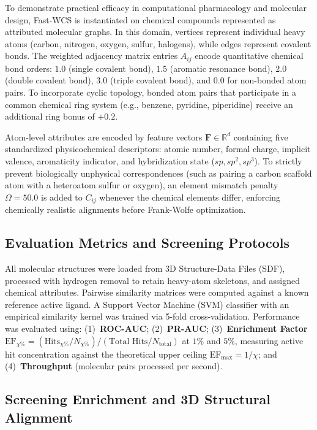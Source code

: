 \documentclass[conference]{IEEEtran}
\begin{document}
To demonstrate practical efficacy in computational pharmacology and molecular design, Fast-WCS is instantiated on chemical compounds represented as attributed molecular graphs. In this domain, vertices represent individual heavy atoms (carbon, nitrogen, oxygen, sulfur, halogens), while edges represent covalent bonds. The weighted adjacency matrix entries $A_{ij}$ encode quantitative chemical bond orders: $1.0$ (single covalent bond), $1.5$ (aromatic resonance bond), $2.0$ (double covalent bond), $3.0$ (triple covalent bond), and $0.0$ for non-bonded atom pairs. To incorporate cyclic topology, bonded atom pairs that participate in a common chemical ring system (e.g., benzene, pyridine, piperidine) receive an additional ring bonus of $+0.2$.

Atom-level attributes are encoded by feature vectors $\mathbf{F} \in \mathbb{R}^{d}$ containing five standardized physicochemical descriptors: atomic number, formal charge, implicit valence, aromaticity indicator, and hybridization state ($sp, sp^2, sp^3$). To strictly prevent biologically unphysical correspondences (such as pairing a carbon scaffold atom with a heteroatom sulfur or oxygen), an element mismatch penalty $\Omega = 50.0$ is added to $C_{ij}$ whenever the chemical elements differ, enforcing chemically realistic alignments before Frank-Wolfe optimization.

\subsection{Evaluation Metrics and Screening Protocols}

All molecular structures were loaded from 3D Structure-Data Files (SDF), processed with hydrogen removal to retain heavy-atom skeletons, and assigned chemical attributes. Pairwise similarity matrices were computed against a known reference active ligand. A Support Vector Machine (SVM) classifier with an empirical similarity kernel was trained via 5-fold cross-validation. Performance was evaluated using: (1)~\textbf{ROC-AUC}; (2)~\textbf{PR-AUC}; (3)~\textbf{Enrichment Factor} $\text{EF}_{\chi\%} = (\text{Hits}_{\chi\%} / N_{\chi\%}) / (\text{Total Hits} / N_{\text{total}})$ at $1\%$ and $5\%$, measuring active hit concentration against the theoretical upper ceiling $\text{EF}_{\max} = 1 / \chi$; and (4)~\textbf{Throughput} (molecular pairs processed per second).

\subsection{Screening Enrichment and 3D Structural Alignment}
\end{document}
